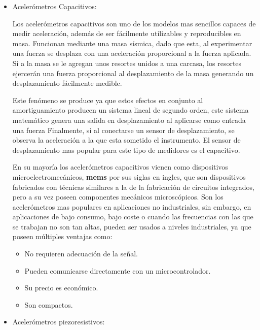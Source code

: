 \begin{itemize}
    \item  Acelerómetros Capacitivos:

        Los acelerómetros capacitivos son uno de los modelos mas sencillos
        capaces de medir
        aceleración, además de ser fácilmente utilizables y reproducibles en masa.
        Funcionan mediante una masa sísmica, dado que esta, al  experimentar una fuerza
        se desplaza con una aceleración proporcional a la fuerza aplicada.
        Si a la masa se le agregan unos resortes unidos a una carcasa, los resortes
        ejercerán una fuerza proporcional al desplazamiento de la masa generando un
        desplazamiento fácilmente medible.

        Este fenómeno se produce ya que estos efectos en conjunto al
        amortiguamiento producen un sistema lineal de
        segundo orden, este sistema matemático genera una salida en desplazamiento
        al aplicarse como entrada una fuerza
         Finalmente, si al conectarse un sensor de desplazamiento, se observa
        la aceleración a la que esta sometido el instrumento.
        El sensor de desplazamiento mas
        popular para este tipo de medidores es el capacitivo.

        En su mayoría los acelerómetros capacitivos vienen como dispositivos
        microelectromecánicos, \textbf{mems} por sus siglas en ingles, que son
        dispositivos
        fabricados con técnicas similares a la de la fabricación de circuitos
        integrados, pero a su vez poseen componentes mecánicos microscópicos. Son los
        acelerómetros mas populares en aplicaciones no industriales, sin embargo,
        en aplicaciones de bajo consumo, bajo coste o cuando las frecuencias con
        las que se trabajan no son tan altas, pueden ser usados a niveles
        industriales, ya que poseen múltiples ventajas como:

        \begin{itemize}
            \item No requieren adecuación de la señal.
            \item Pueden comunicarse directamente con un microcontrolador.
            \item Su precio es económico.
            \item Son compactos.
        \end{itemize}


    \item  Acelerómetros piezoresistivos:


\end{itemize}
